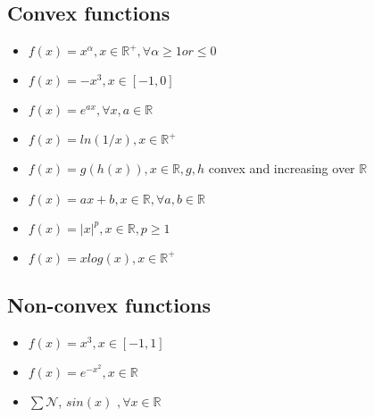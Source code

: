 \subsection{Convex functions}
\begin{itemize}
\item $f(x) = x^{\alpha}, x \in \mathbb{R^+}, \forall \alpha \ge 1 or \le 0$
\item $f(x) = -x^3, x \in [-1,0]$
\item $f(x) = e^{ax}, \forall x,a \in \mathbb{R}$
\item $f(x) = ln(1/x), x \in \mathbb{R^+}$
\item $f(x) = g(h(x)), x \in \mathbb{R}, g,h$ convex and increasing over $\mathbb{R}$
\item $f(x) = ax+b, x \in \mathbb{R}, \forall a,b \in \mathbb{R}$
\item $f(x) = |x|^p, x \in \mathbb{R}, p\ge 1$
\item $f(x) = xlog(x), x \in \mathbb{R}^+$
\end{itemize}

\subsection{Non-convex functions}
\begin{itemize}
\item $f(x) = x^3, x \in [-1,1]$
\item $f(x) = e^{-x^2}, x \in \mathbb{R}$
\item $\sum \mathcal{N}$, $sin(x)\,\, , \forall x \in \mathbb{R}$ \newline
\end{itemize}
